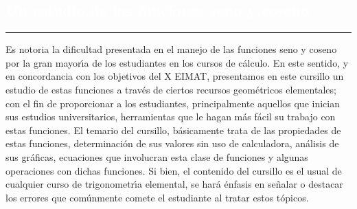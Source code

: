 \begin{titlepage}
\pagecolor{white}
\BgThispage
{}
\vspace*{-1.1cm}
\noindent
\def\titulo#1{\section{#1}}
\section{\bf\large\textcolor{white}{Un estudio de las funciones seno y coseno}}
\vspace*{2cm}\par
\noindent

\begin{minipage}{0.5\linewidth}
\begin{minipage}{0.45\linewidth}
    \begin{flushright}
        \printauthor
    \end{flushright}
\end{minipage} \hspace{0pt}
%
\begin{minipage}{0.02\linewidth}
      \color{ptctitle} \rule{1pt}{175pt}
\end{minipage} 
\end{minipage}
\hspace*{-4.5cm}
%
\begin{minipage}{0.85\linewidth}
\begin{minipage}{0.85\linewidth}
\footnotesize
\vspace{5pt}
    \begin{resumen}     
Es notoria la dificultad presentada en el manejo de las funciones seno y coseno por la gran mayor\'{\i}a de los  estudiantes en los cursos de c\'{a}lculo. En este sentido, y en concordancia con los objetivos del X EIMAT, presentamos en este cursillo un estudio de estas funciones a trav\'{e}s de ciertos recursos geom\'{e}tricos elementales; con el fin de proporcionar a los estudiantes, principalmente aquellos que inician sus estudios universitarios, herramientas que le hagan m\'{a}s f\'{a}cil su trabajo con estas funciones. El temario del cursillo, b\'{a}sicamente trata de las propiedades de estas funciones, determinaci\'{o}n de sus valores sin uso de calculadora, an\'{a}lisis de sus gr\'{a}ficas, ecuaciones que involucran esta clase de funciones y algunas operaciones con dichas funciones. Si bien, el contenido del cursillo es el usual de cualquier curso de trigonometr\'{\i}a elemental, se har\'{a} \'{e}nfasis en se\~nalar o destacar los errores que com\'{u}nmente comete el estudiante al tratar estos t\'{o}picos.

\end{resumen}
\end{minipage}
\end{minipage}
\end{titlepage}
